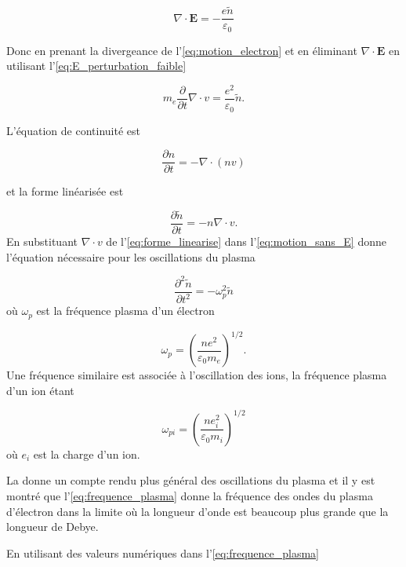 \documentclass[main.tex]{subfiles}
\begin{document}
\begin{equation}
	\nabla \cdot \bm{E} = - \frac{e \tilde{n}}{\varepsilon_0}
	\label{eq:E_perturbation_faible}
\end{equation}

\noindent Donc en prenant la divergeance de l'\autoref{eq:motion_electron} et en éliminant \( \nabla \cdot \bm{E} \) en utilisant l'\autoref{eq:E_perturbation_faible}

\begin{equation}
	m_e \frac{\partial }{\partial t} \nabla \cdot v = \frac{e^2}{\varepsilon_0} \tilde{n}.
	\label{eq:motion_sans_E}
\end{equation}

\noindent L'équation de continuité est

\[
	\frac{\partial n}{\partial t} = - \nabla \cdot (nv)
\]

\noindent et la forme linéarisée est

\begin{equation}
	\frac{\partial \tilde{n}}{\partial t} = -n \nabla \cdot v.
	\label{eq:forme_linearise}
\end{equation}
En substituant \( \nabla \cdot v \) de l'\autoref{eq:forme_linearise} dans l'\autoref{eq:motion_sans_E} donne l'équation nécessaire pour les oscillations du plasma

\[
	\frac{\partial^2 \tilde{n}}{\partial t^2} = - \omega_p^2 \tilde{n}
\]
où \( \omega_p \) est la fréquence plasma d'un électron

\begin{equation}
	\omega_p = \left( \frac{n e^2}{\varepsilon_0 m_e} \right)^{1/2}.
	\label{eq:frequence_plasma}
\end{equation}
Une fréquence similaire est associée à l'oscillation des ions, la fréquence plasma d'un ion étant

\begin{equation}
	\omega_{pi} = \left( \frac{n e_i^2}{\varepsilon_0 m_i} \right)^{1/2}
	\label{eq:frequence_plasma_ion}
\end{equation}
où \( e_i \) est la charge d'un ion.

La \color{red}{Section 2.25 (lien à rajouter quand elle sera faite)}\color{black} donne un compte rendu plus général des oscillations du plasma et il y est montré que l'\autoref{eq:frequence_plasma} donne la fréquence des ondes du plasma d'électron dans la limite où la longueur d'onde est beaucoup plus grande que la longueur de Debye.

En utilisant des valeurs numériques dans l'\autoref{eq:frequence_plasma}
\end{document}
